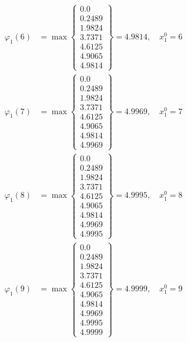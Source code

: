 \documentclass{article}
\begin{document}
\begin{align*}
  
  
  
\varphi_{1}(6) &= \max \left\{ \begin{array}{c}
0.0 \\
 0.2489 \\
 1.9824 \\
 3.7371 \\
 4.6125 \\
 4.9065 \\
 4.9814
\end{array} \right\}=4.9814,\quad x_{1}^0=6\\
  
  
  
  
\varphi_{1}(7) &= \max \left\{ \begin{array}{c}
0.0 \\
 0.2489 \\
 1.9824 \\
 3.7371 \\
 4.6125 \\
 4.9065 \\
 4.9814 \\
 4.9969
\end{array} \right\}=4.9969,\quad x_{1}^0=7\\
  
  
  
  
\varphi_{1}(8) &= \max \left\{ \begin{array}{c}
0.0 \\
 0.2489 \\
 1.9824 \\
 3.7371 \\
 4.6125 \\
 4.9065 \\
 4.9814 \\
 4.9969 \\
 4.9995
\end{array} \right\}=4.9995,\quad x_{1}^0=8\\
  
  
  
  
\varphi_{1}(9) &= \max \left\{ \begin{array}{c}
0.0 \\
 0.2489 \\
 1.9824 \\
 3.7371 \\
 4.6125 \\
 4.9065 \\
 4.9814 \\
 4.9969 \\
 4.9995 \\
 4.9999
\end{array} \right\}=4.9999,\quad x_{1}^0=9\\
  

\end{align*}
\end{document}
